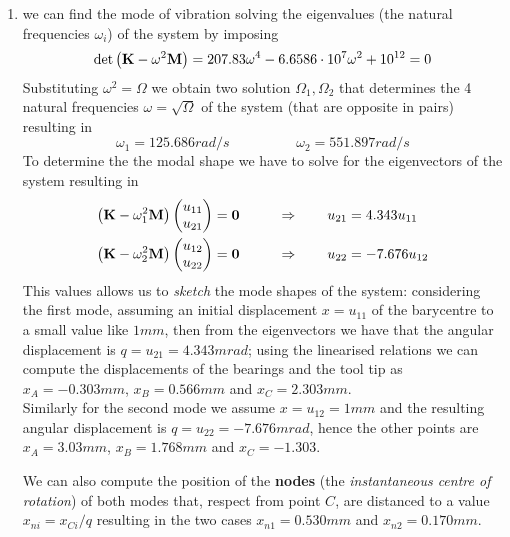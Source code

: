\begin{enumerate}[\itshape i)]
			\item we can find the mode of vibration solving  the eigenvalues (the natural frequencies $\omega_i$) of the system by imposing
			\[ \det \big(\mathbf{K} - \omega^2 \mathbf{M} \big) = 207.83\omega^4 - 6.6586\cdot 10^7 \omega^2  + 10^{12} = 0 \]
			Substituting $\omega^2 = \Omega$ we obtain two solution $\Omega_1,\Omega_2$ that determines the 4 natural frequencies $\omega = \sqrt \Omega$ of the system (that are opposite in pairs) resulting in
			\[ \omega_1 = 125.686 rad/s \hspace{2cm} \omega_2 = 551.897 rad/s  \]
			To determine the the modal shape we have to solve for the eigenvectors of the system resulting in
			\begin{align*}
				\big(\mathbf{K} - \omega_1^2 \mathbf{M}\big) \begin{pmatrix} u_{11} \\ u_{21}  \end{pmatrix} & = \boldsymbol{0} \qquad & \Rightarrow \qquad u_{21} & = 4.343 u_{11} \\
				\big(\mathbf{K} - \omega_2^2 \mathbf{M}\big) \begin{pmatrix} u_{12} \\ u_{22}  \end{pmatrix} & = \boldsymbol{0} \qquad & \Rightarrow \qquad u_{22} & = -7.676 u_{12} 
			\end{align*}
			This values allows us to \textit{sketch} the mode shapes of the system: considering the first mode, assuming an initial displacement $x = u_{11}$ of the barycentre to a small value like $1mm$, then from the eigenvectors we have that the angular displacement is $q = u_{21} = 4.343mrad$; using the linearised relations we can compute the displacements of the bearings and the tool tip as $x_A= -0.303mm$, $x_B = 0.566mm$ and $x_C = 2.303mm$. \\ Similarly for the second mode we assume $x = u_{12} = 1mm$ and the resulting angular displacement is $q = u_{22} = -7.676 mrad$, hence the other points are $x_A = 3.03mm$, $x_B = 1.768mm$ and $x_C = -1.303$.
			
			We can also compute the position of the \textbf{nodes} (the \textit{instantaneous centre of rotation}) of both modes that, respect from point $C$, are distanced to a value $x_{ni} = x_{Ci}/q$ resulting in the two cases $x_{n1} = 0.530mm$ and $x_{n2} = 0.170mm$.
			

\end{enumerate}

